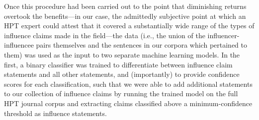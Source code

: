 \documentclass[11pt]{article}
\begin{document}





Once this procedure had been carried out to the point that diminishing returns overtook the benefits---in our case, the admittedly subjective point at which an HPT expert could attest that it covered a substantially wide range of the types of influence claims made in the field---the data (i.e., the union of the influencer-influencee pairs themselves and the sentences in our corpora which pertained to them) was used as the input to two separate machine learning models. In the first, a binary classifier was trained to differentiate between influence claim statements and all other statements, and (importantly) to provide confidence scores for each classification, such that we were able to add additional statements to our collection of influence claims by running the trained model on the full HPT journal corpus and extracting claims classified above a minimum-confidence threshold as influence statements.
\end{document}
